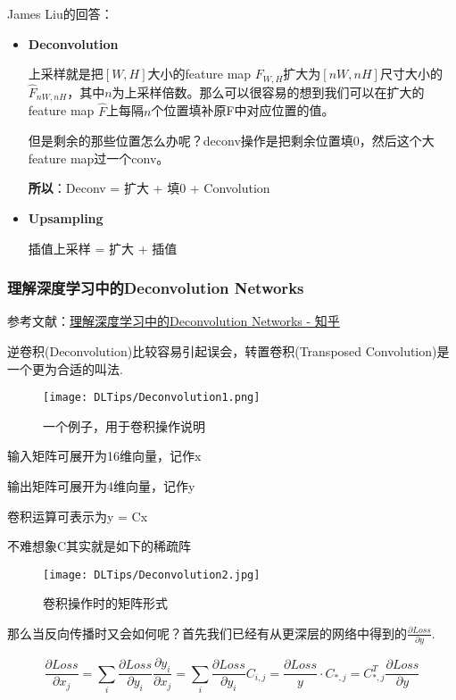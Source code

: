 James Liu的回答：

\begin{itemize}
\item \textbf{Deconvolution}

上采样就是把$[W,H]$大小的feature map $F_{W,H}$扩大为$[nW,nH]$尺寸大小的$\hat{F}_{nW,nH}$，其中$n$为上采样倍数。那么可以很容易的想到我们可以在扩大的feature map $\hat{F}$上每隔$n$个位置填补原F中对应位置的值。

但是剩余的那些位置怎么办呢？deconv操作是把剩余位置填0，然后这个大feature map过一个conv。

\textbf{所以}：Deconv = 扩大 + 填0 + Convolution

\item \textbf{Upsampling}

插值上采样 = 扩大 + 插值

\end{itemize}

\subsubsection{理解深度学习中的Deconvolution Networks}

参考文献：\href{https://www.zhihu.com/question/43609045}{理解深度学习中的Deconvolution Networks - 知乎}


逆卷积(Deconvolution)比较容易引起误会，转置卷积(Transposed Convolution)是一个更为合适的叫法.

\begin{figure}[!hbtp]
\centering
\texttt{[image: DLTips/Deconvolution1.png]}
\caption{一个例子，用于卷积操作说明}
\label{Deconvolution1}
\end{figure}
输入矩阵可展开为16维向量，记作x

输出矩阵可展开为4维向量，记作y

卷积运算可表示为y = Cx

不难想象C其实就是如下的稀疏阵
\begin{figure}[!htbp]
\centering
\texttt{[image: DLTips/Deconvolution2.jpg]}
\caption{卷积操作时的矩阵形式}
\label{Deconvolution2}
\end{figure}

那么当反向传播时又会如何呢？首先我们已经有从更深层的网络中得到的$\frac{\partial Loss}{\partial y}$.

\begin{displaymath}
\frac{\partial{Loss}}{\partial{x_j}} = \sum_{i}\frac{\partial{Loss}}{\partial y_i} \frac{\partial y_i}{\partial{x_j}} = \sum_{i} \frac{\partial{Loss}}{\partial y_i} C_{i, j} = \frac{\partial{Loss}}{y} \cdot C_{*, j} = C_{*, j}^T \frac{\partial{Loss}}{\partial y}
\end{displaymath}

